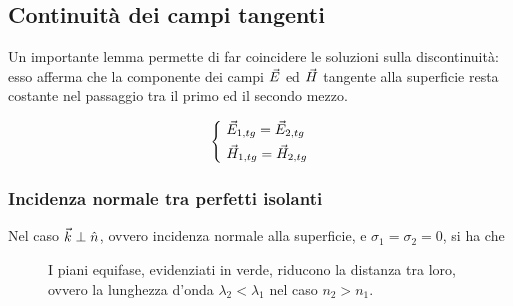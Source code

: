 \subsection{Continuità dei campi tangenti}
Un importante lemma permette di far coincidere le soluzioni sulla discontinuità: esso afferma che la componente dei campi $\vec{E}$ ed $\vec{H}$ tangente alla superficie resta costante nel passaggio tra il primo ed il secondo mezzo.

\begin{equation}
	\begin{dcases}
		~ \vec{E}_{1, tg} = \vec{E}_{2, tg} \\
		~ \vec{H}_{1, tg} = \vec{H}_{2, tg}
	\end{dcases}
\end{equation}

\subsubsection{Incidenza normale tra perfetti isolanti}
Nel caso $\vec{k} \perp \hat{n}$, ovvero incidenza normale alla superficie, e $\sigma_1 = \sigma_2 = 0$, si ha che

\begin{figure}[h] \label{fig:incidenza_normale_isolanti}
	\centering
	
	\caption{I piani equifase, evidenziati in verde, riducono la distanza tra loro, ovvero la lunghezza d'onda $\lambda_2 < \lambda_1$ nel caso $n_2 > n_1$.}
\end{figure}
